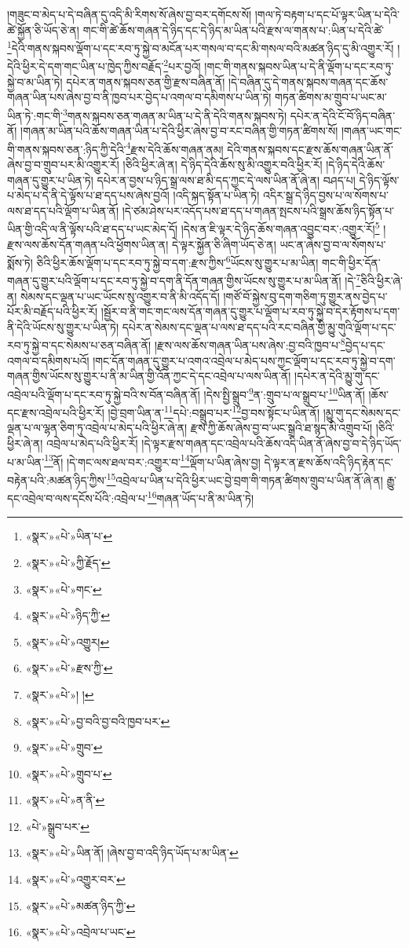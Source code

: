 །གཟུང་བ་མེད་པ་དེ་བཞིན་དུ་འདི་མི་རིགས་སོ་ཞེས་བྱ་བར་དགོངས་སོ། །གལ་ཏེ་བརྟག་པ་དང་པོ་ལྟར་ཡིན་པ་དེའི་ཚེ་སྐྱོན་ཅི་ཡོད་ཅེ་ན། གང་གི་ཚེ་ཆོས་གཞན་དེ་ཉིད་དང་དེ་ཉིད་མ་ཡིན་པའི་རྫས་ལ་གནས་པ་:ཡིན་པ་དེའི་ཚེ་\footnote{«སྣར་»«པེ་»ཡིན་པ་}དེའི་གནས་སྐབས་ལྡོག་པ་དང་རབ་ཏུ་སྐྱེ་བ་མངོན་པར་གསལ་བ་དང་མི་གསལ་བའི་མཚན་ཉིད་དུ་མི་འགྱུར་རོ། །དེའི་ཕྱིར་དེ་དག་གང་ཡིན་པ་ཁྱེད་ཀྱིས་བརྗོད་\footnote{«སྣར་»«པེ་»ཀྱི་རྗོད་}པར་བྱའོ། །གང་གི་གནས་སྐབས་ཡིན་པ་དེ་ནི་ལྡོག་པ་དང་རབ་ཏུ་སྐྱེ་བ་མ་ཡིན་ཏེ། དཔེར་ན་གནས་སྐབས་ཅན་གྱི་རྫས་བཞིན་ནོ། །དེ་བཞིན་དུ་དེ་གནས་སྐབས་གཞན་དང་ཆོས་གཞན་ཡིན་པས་ཞེས་བྱ་བ་ནི་ཁྱབ་པར་བྱེད་པ་འགལ་བ་དམིགས་པ་ཡིན་ཏེ། གཏན་ཚིགས་མ་གྲུབ་པ་ཡང་མ་ཡིན་ཏེ་:གང་གི་\footnote{«སྣར་»«པེ་»གང་}གནས་སྐབས་ཅན་གཞན་མ་ཡིན་པ་དེ་ནི་དེའི་གནས་སྐབས་ཏེ། དཔེར་ན་དེའི་ངོ་བོ་ཉིད་བཞིན་ནོ། །གཞན་མ་ཡིན་པའི་ཆོས་གཞན་ཡིན་པ་དེའི་ཕྱིར་ཞེས་བྱ་བ་རང་བཞིན་གྱི་གཏན་ཚིགས་སོ། །གཞན་ཡང་གང་གི་གནས་སྐབས་ཅན་:ཉིད་ཀྱི་དེའི་\footnote{«སྣར་»«པེ་»ཉིད་ཀྱི་}རྫས་དེའི་ཆོས་གཞན་ནམ། དེའི་གནས་སྐབས་དང་རྫས་ཆོས་གཞན་ཡིན་ནོ་ཞེས་བྱ་བ་གྲུབ་པར་མི་འགྱུར་རོ། །ཅིའི་ཕྱིར་ཞེ་ན། དེ་ཉིད་དེའི་ཆོས་སུ་མི་འགྱུར་བའི་ཕྱིར་རོ། །དེ་ཉིད་དེའི་ཆོས་གཞན་དུ་གྱུར་པ་ཡིན་ཏེ། དཔེར་ན་བྱས་པ་ཉིད་སྒྲ་ལས་ཐ་མི་དད་ཀྱང་དེ་ལས་ཡིན་ནོ་ཞེ་ན། བཤད་པ། དེ་ཉིད་ལྟོས་པ་མེད་པ་དེ་ནི་དེ་ལྟོས་པ་ཐ་དད་པས་ཞེས་བྱའོ། །འདི་སྐད་སྟོན་པ་ཡིན་ཏེ། འདིར་སྒྲ་དེ་ཉིད་བྱས་པ་ལ་སོགས་པ་ལས་ཐ་དད་པའི་ལྡོག་པ་ཡིན་ནོ། །དེ་ཙམ་ཤེས་པར་འདོད་པས་ཐ་དད་པ་གཞན་སྤངས་པའི་སྒྲས་ཆོས་ཉིད་སྟོན་པ་ཡིན་གྱི་འདི་ལ་ནི་ལྟོས་པའི་ཐ་དད་པ་ཡང་མེད་དོ། །དེས་ན་ཇི་ལྟར་དེ་ཉིད་ཆོས་གཞན་འབྱུང་བར་:འགྱུར་རོ།\footnote{«སྣར་»«པེ་»འགྱུར།} །རྫས་ལས་ཆོས་དོན་གཞན་པའི་ཕྱོགས་ཡིན་ན། དེ་ལྟར་སྐྱོན་ཅི་ཞིག་ཡོད་ཅེ་ན། ཡང་ན་ཞེས་བྱ་བ་ལ་སོགས་པ་སྨོས་ཏེ། ཅིའི་ཕྱིར་ཆོས་ལྡོག་པ་དང་རབ་ཏུ་སྐྱེ་བ་དག་:རྫས་ཀྱིས་\footnote{«སྣར་»«པེ་»རྫས་ཀྱི་}ཡོངས་སུ་གྱུར་པ་མ་ཡིན། གང་གི་ཕྱིར་དོན་གཞན་དུ་གྱུར་པའི་ལྡོག་པ་དང་རབ་ཏུ་སྐྱེ་བ་དག་ནི་དོན་གཞན་གྱིས་ཡོངས་སུ་གྱུར་པ་མ་ཡིན་ནོ། །དེ་\footnote{«སྣར་»«པེ་»། །}ཅིའི་ཕྱིར་ཞེ་ན། སེམས་དང་ལྡན་པ་ཡང་ཡོངས་སུ་འགྱུར་བ་ནི་མི་འདོད་དོ། །གཙོ་བོ་སྐྱེས་བུ་དག་གཅིག་ཏུ་གྱུར་ནས་བྱེད་པ་པོར་མི་བརྗོད་པའི་ཕྱིར་རོ། །སྦྱོར་བ་ནི་གང་གང་ལས་དོན་གཞན་དུ་གྱུར་པ་ལྡོག་པ་རབ་ཏུ་སྐྱེ་བ་དེར་རྟོགས་པ་དག་ནི་དེའི་ཡོངས་སུ་གྱུར་པ་ཡིན་ཏེ། དཔེར་ན་སེམས་དང་ལྡན་པ་ལས་ཐ་དད་པའི་རང་བཞིན་གྱི་མྱུ་གུའི་ལྡོག་པ་དང་རབ་ཏུ་སྐྱེ་བ་དང་སེམས་པ་ཅན་བཞིན་ནོ། །རྫས་ལས་ཆོས་གཞན་ཡིན་པས་ཞེས་:བྱ་བའི་ཁྱབ་པ་\footnote{«སྣར་»«པེ་»བྱ་བའི་བྱ་བའི་ཁྱབ་པར་}བྱེད་པ་དང་འགལ་བ་དམིགས་པའོ། །གང་དོན་གཞན་དུ་གྱུར་པ་འགའ་འབྲེལ་པ་མེད་པས་ཀྱང་ལྡོག་པ་དང་རབ་ཏུ་སྐྱེ་བ་དག་གཞན་གྱིས་ཡོངས་སུ་གྱུར་པ་ནི་མ་ཡིན་གྱི་འོན་ཀྱང་དེ་དང་འབྲེལ་པ་ལས་ཡིན་ནོ། །དཔེར་ན་དེའི་མྱུ་གུ་དང་འབྲེལ་པའི་ལྡོག་པ་དང་རབ་ཏུ་སྐྱེ་བའི་ས་བོན་བཞིན་ནོ། །དེས་སྤྱི་སྒྲུབ་\footnote{«སྣར་»«པེ་»གྲུབ་}ན་:གྲུབ་པ་ལ་སྒྲུབ་པ་\footnote{«སྣར་»«པེ་»གྲུབ་པ་}ཡིན་ནོ། །ཆོས་དང་རྫས་འབྲེལ་པའི་ཕྱིར་རོ། །བྱེ་བྲག་ཡིན་ན་\footnote{«སྣར་»«པེ་»ན་ནི་}དཔེ་:བསྒྲུབ་པར་\footnote{«པེ་»སྒྲུབ་པར་}བྱ་བས་སྟོང་པ་ཡིན་ནོ། །མྱུ་གུ་དང་སེམས་དང་ལྡན་པ་ལ་ལྷན་ཅིག་ཏུ་འབྲེལ་པ་མེད་པའི་ཕྱིར་ཞེ་ན། རྫས་ཀྱི་ཆོས་ཞེས་བྱ་བ་ཡང་སྒྲའི་ཐ་སྙད་མི་འགྲུབ་པོ། །ཅིའི་ཕྱིར་ཞེ་ན། འབྲེལ་པ་མེད་པའི་ཕྱིར་རོ། །དེ་ལྟར་རྫས་གཞན་དང་འབྲེལ་པའི་ཆོས་འདི་ཡིན་ནོ་ཞེས་བྱ་བ་དེ་ཉིད་ཡོད་པ་མ་ཡིན་\footnote{«སྣར་»«པེ་»ཡིན་ནོ། །ཞེས་བྱ་བ་འདི་ཉིད་ཡོད་པ་མ་ཡིན་}ནོ། །དེ་གང་ལས་ཐལ་བར་:འགྱུར་བ་\footnote{«སྣར་»«པེ་»འགྱུར་བར་}ལྡོག་པ་ཡིན་ཞེས་བྱ། དེ་ལྟར་ན་རྫས་ཆོས་འདི་ཉིད་རྟེན་དང་བརྟེན་པའི་:མཚན་ཉིད་ཀྱིས་\footnote{«སྣར་»«པེ་»མཚན་ཉིད་ཀྱི་}འབྲེལ་པ་ཡིན་པ་དེའི་ཕྱིར་ཡང་བྱེ་བྲག་གི་གཏན་ཚིགས་གྲུབ་པ་ཡིན་ནོ་ཞེ་ན། རྒྱུ་དང་འབྲེལ་བ་ལས་དངོས་པོའི་:འབྲེལ་པ་\footnote{«སྣར་»«པེ་»འབྲེལ་པ་ཡང་}གཞན་ཡོད་པ་ནི་མ་ཡིན་ཏེ། 